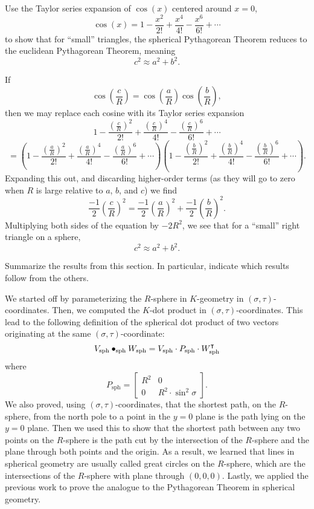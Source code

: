 \documentclass[newpage,hints,handout,noauthor,nooutcomes,12pt]{ximera}
\begin{document}
\begin{problem}
  Use the Taylor series expansion of $\cos(x)$ centered around $x=0$,
  \[
  \cos(x) = 1 - \frac{x^2}{2!} + \frac{x^4}{4!} - \frac{x^6}{6!} + \cdots
  \]
to show that for ``small'' triangles, the spherical Pythagorean
Theorem reduces to the euclidean Pythagorean Theorem, meaning
\[
c^2 \approx a^2+b^2.
\]
\begin{freeResponse}
  If
  \[
  \cos\left(\frac{c}{R}\right)=\cos\left(\frac{a}{R}\right)\cos\left(\frac{b}{R}\right),
  \]
  then we may replace each cosine with its Taylor series expansion
  \[
  1 - \frac{\left(\frac{c}{R}\right)^2}{2!} + \frac{\left(\frac{c}{R}\right)^4}{4!} - \frac{\left(\frac{c}{R}\right)^6}{6!} + \cdots
  \]
  \[
  =\left(
  1 - \frac{\left(\frac{a}{R}\right)^2}{2!} + \frac{\left(\frac{a}{R}\right)^4}{4!} - \frac{\left(\frac{a}{R}\right)^6}{6!} + \cdots
  \right)
  \left(
  1 - \frac{\left(\frac{b}{R}\right)^2}{2!} + \frac{\left(\frac{b}{R}\right)^4}{4!} - \frac{\left(\frac{b}{R}\right)^6}{6!} + \cdots
  \right).
  \]
  Expanding this out, and discarding higher-order terms (as they will
  go to zero when $R$ is large relative to $a$, $b$, and $c$) we find
  \[
  \frac{-1}{2}\left(\frac{c}{R}\right)^2 = \frac{-1}{2}\left(\frac{a}{R}\right)^2+\frac{-1}{2}\left(\frac{b}{R}\right)^2.
  \]
  Multiplying both sides of the equation by $-2R^2$, we see that for a
  ``small'' right triangle on a sphere,
  \[
  c^2 \approx a^2 +b^2.
  \]
\end{freeResponse}
\end{problem}


\begin{problem}
Summarize the results from this section. In particular, indicate which
results follow from the others.
\begin{freeResponse}
We started off by parameterizing the $R$-sphere in $K$-geometry in $\left(\sigma,\tau \right)$-coordinates. Then, we computed the $K$-dot product in  $\left(\sigma,\tau \right)$-coordinates. This lead to the following definition of the spherical dot product of two vectors originating at the same $\left(\sigma,\tau \right)$-coordinate: 
\[
  V_\mathrm{sph} \bullet_\mathrm{sph} W_\mathrm{sph} = V_\mathrm{sph} \cdot P_\mathrm{sph} \cdot W_\mathrm{sph}^\intercal
  \]
  where
  \[
  P_\mathrm{sph} =
  \begin{bmatrix}
    R^2 & 0 \\
    0 & R^2\cdot\sin^2 \sigma
  \end{bmatrix}.
  \]
We also proved, using $\left(\sigma,\tau \right)$-coordinates, that the shortest path, on the $R$-sphere, from the north pole to a point in the $y=0$ plane is the path lying on the $y=0$ plane. Then we used this to show that the shortest path between any two points on the $R$-sphere is the path cut by the intersection of the $R$-sphere and the plane through both points and the origin. As a result, we learned that lines in spherical geometry are usually called great circles on the $R$-sphere, which are the intersections of the $R$-sphere with plane through $\left(0, 0, 0\right)$. Lastly, we applied the previous work to prove the analogue to the Pythagorean Theorem in spherical geometry. 
\end{freeResponse}
\end{problem}
\end{document}
